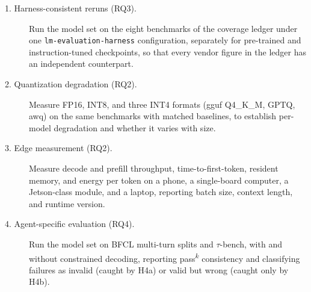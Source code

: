 \begin{description}
  \item[1. Harness-consistent reruns (RQ3).] Run the model set on the eight benchmarks of the coverage ledger under one \texttt{lm-evaluation-harness} configuration, separately for pre-trained and instruction-tuned checkpoints, so that every vendor figure in the ledger has an independent counterpart.
  \item[2. Quantization degradation (RQ2).] Measure FP16, INT8, and three INT4 formats (\gls{gguf} Q4\_K\_M, GPTQ, \gls{awq}) on the same benchmarks with matched baselines, to establish per-model degradation and whether it varies with size.
  \item[3. Edge measurement (RQ2).] Measure decode and prefill throughput, time-to-first-token, resident memory, and energy per token on a phone, a single-board computer, a Jetson-class module, and a laptop, reporting batch size, context length, and runtime version.
  \item[4. Agent-specific evaluation (RQ4).] Run the model set on BFCL multi-turn splits and $\tau$-bench, with and without constrained decoding, reporting pass\textsuperscript{$k$} consistency and classifying failures as invalid (caught by H4a) or valid but wrong (caught only by H4b).

\end{description}
